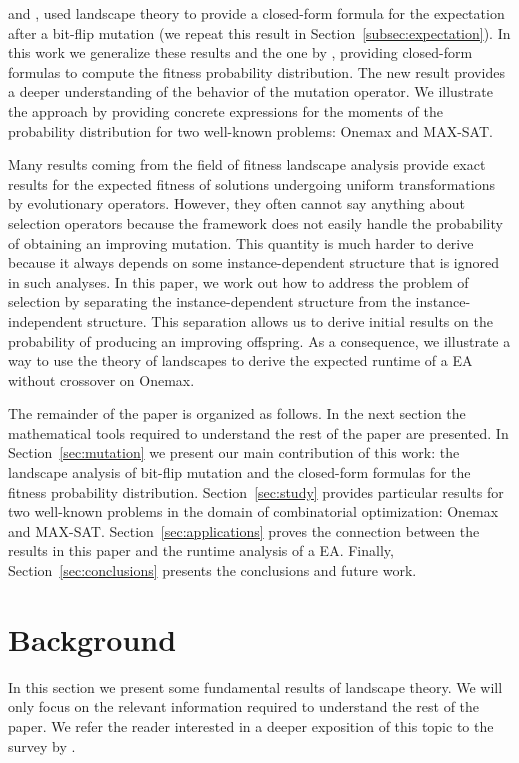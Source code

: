 \documentclass{article}
\begin{document}
\cite{Sutton2011gecco} and \cite{Chicano2011gecco}, used landscape theory to provide a closed-form formula for the expectation after a bit-flip mutation (we repeat this result in Section~\ref{subsec:expectation}). In this work we generalize these results and the one by \cite{Sutton2011foga}, providing closed-form formulas to compute the fitness probability distribution. The new result provides a deeper understanding of the behavior of the mutation operator. We illustrate the approach by providing concrete expressions for the moments of the probability distribution for two well-known problems: Onemax and MAX-SAT. 

Many results coming from the field of fitness landscape analysis provide exact results for the expected fitness of solutions undergoing uniform transformations by evolutionary operators. However, they often cannot say anything about selection operators because the framework does not easily handle the probability of obtaining an improving mutation. This quantity is much harder to derive because it always depends on some instance-dependent structure that is ignored in such analyses. In this paper, we work out how to address the problem of selection by separating the instance-dependent structure from the instance-independent structure. This separation allows us to derive initial results on the probability of producing an improving offspring. As a consequence, we illustrate a way to use the theory of landscapes to derive the expected runtime of a  EA without crossover on Onemax.

The remainder of the paper is organized as follows. In the next section the mathematical tools required to understand the rest of the paper are presented. In Section~\ref{sec:mutation} we present our main contribution of this work: the landscape analysis of bit-flip mutation and the closed-form formulas for the fitness probability distribution. Section~\ref{sec:study} provides particular results for two well-known problems in the domain of combinatorial optimization: Onemax and MAX-SAT. Section~\ref{sec:applications} proves the connection between the results in this paper and the runtime analysis of a  EA. Finally, Section~\ref{sec:conclusions} presents the conclusions and future work.

\section{Background}
\label{sec:background}

In this section we present some fundamental results of landscape theory. We will only focus on the relevant information required to understand the rest of the paper. We refer the reader interested in a deeper exposition of this topic to the survey by \cite{Reidys2002}.
\end{document}

